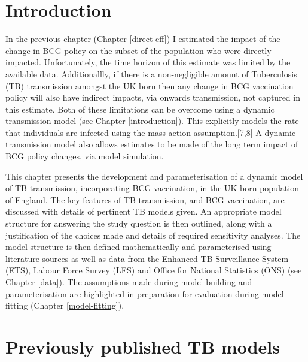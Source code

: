 \documentclass[11pt,twoside]{bristolthesis}
\begin{document}
  \hypertarget{introduction-6}{%
  \section{Introduction}\label{introduction-6}}
  
  In the previous chapter (Chapter \ref{direct-eff}) I estimated the impact of the change in BCG policy on the subset of the population who were directly impacted. Unfortunately, the time horizon of this estimate was limited by the available data. Additionallly, if there is a non-negligible amount of Tuberculosis (TB) transmission amongst the UK born then any change in BCG vaccination policy will also have indirect impacts, via onwards transmission, not captured in this estimate. Both of these limitations can be overcome using a dynamic transmission model (see Chapter \ref{introduction}). This explicitly models the rate that individuals are infected using the mass action assumption.{[}\protect\hyperlink{ref-Anderson1991}{7},\protect\hyperlink{ref-Keeling2007}{8}{]} A dynamic transmission model also allows estimates to be made of the long term impact of BCG policy changes, via model simulation.
  
  This chapter presents the development and parameterisation of a dynamic model of TB transmission, incorporating BCG vaccination, in the UK born population of England. The key features of TB transmission, and BCG vaccination, are discussed with details of pertinent TB models given. An appropriate model structure for answering the study question is then outlined, along with a justification of the choices made and details of required sensitivity analyses. The model structure is then defined mathematically and parameterised using literature sources as well as data from the Enhanced TB Surveillance System (ETS), Labour Force Survey (LFS) and Office for National Statistics (ONS) (see Chapter \ref{data}). The assumptions made during model building and parameterisation are highlighted in preparation for evaluation during model fitting (Chapter \ref{model-fitting}).
  
  \hypertarget{previously-published-tb-models}{%
  \section{Previously published TB models}\label{previously-published-tb-models}}
  
\end{document}
